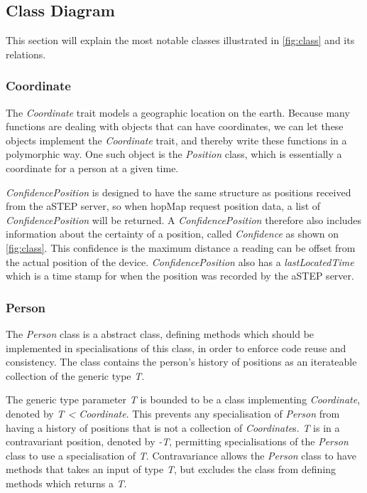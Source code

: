 \subsection{Class Diagram}
This section will explain the most notable classes illustrated in \cref{fig:class} and its relations.

\subsubsection{Coordinate}
The \emph{Coordinate} trait models a geographic location on the earth. Because many functions are dealing with objects that can have coordinates, we can let these objects implement the \emph{Coordinate} trait, and thereby write these functions in a polymorphic way. One such object is the \emph{Position} class, which is essentially a coordinate for a person at a given time.

\emph{ConfidencePosition} is designed to have the same structure as positions received from the aSTEP server, so when hopMap request position data, a list of \emph{ConfidencePosition} will be returned. A \emph{ConfidencePosition} therefore also includes information about the certainty of a position, called \emph{Confidence} as shown on \cref{fig:class}. This confidence is the maximum distance a reading can be offset from the actual position of the device. \emph{ConfidencePosition} also has a \emph{lastLocatedTime} which is a time stamp for when the position was recorded by the aSTEP server.

\subsubsection{Person}
The \emph{Person} class is a abstract class, defining methods which should be implemented in specialisations of this class, in order to enforce code reuse and consistency. The class contains the person's history of positions as an iterateable collection of the generic type \emph{T}. 

The generic type parameter \emph{T} is bounded to be a class implementing \emph{Coordinate}, denoted by \emph{T < Coordinate}. This prevents any specialisation of \emph{Person} from having a history of positions that is not a collection of \emph{Coordinate}s. \emph{T} is in a contravariant position, denoted by \emph{-T}, permitting specialisations of the \emph{Person} class to use a specialisation of \emph{T}. Contravariance allows the \emph{Person} class to have methods that takes an input of type \emph{T}, but excludes the class from defining methods which returns a \emph{T}. 

